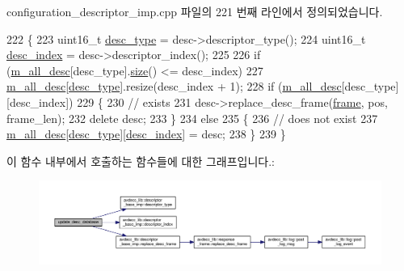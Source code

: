 configuration\+\_\+descriptor\+\_\+imp.\+cpp 파일의 221 번째 라인에서 정의되었습니다.


\begin{DoxyCode}
222 \{
223     uint16\_t \hyperlink{classavdecc__lib_1_1descriptor__base__imp_a9dada313309522d04f1e52fe887442b4}{desc\_type} = desc->descriptor\_type();
224     uint16\_t \hyperlink{classavdecc__lib_1_1descriptor__base__imp_a2bbd0d8f32f687ca36aaa543c06f764c}{desc\_index} = desc->descriptor\_index();
225 
226     \textcolor{keywordflow}{if} (\hyperlink{classavdecc__lib_1_1configuration__descriptor__imp_a5f5e2579d9278982e182299588a710ff}{m\_all\_desc}[desc\_type].\hyperlink{gst__avb__playbin_8c_a439227feff9d7f55384e8780cfc2eb82}{size}() <= desc\_index)
227         \hyperlink{classavdecc__lib_1_1configuration__descriptor__imp_a5f5e2579d9278982e182299588a710ff}{m\_all\_desc}[\hyperlink{classavdecc__lib_1_1descriptor__base__imp_a9dada313309522d04f1e52fe887442b4}{desc\_type}].resize(desc\_index + 1);
228     \textcolor{keywordflow}{if} (\hyperlink{classavdecc__lib_1_1configuration__descriptor__imp_a5f5e2579d9278982e182299588a710ff}{m\_all\_desc}[desc\_type][desc\_index])
229     \{
230         \textcolor{comment}{// exists}
231         desc->replace\_desc\_frame(\hyperlink{gst__avb__playbin_8c_ac8e710e0b5e994c0545d75d69868c6f0}{frame}, pos, frame\_len);
232         \textcolor{keyword}{delete} desc;
233     \}
234     \textcolor{keywordflow}{else}
235     \{
236         \textcolor{comment}{// does not exist}
237         \hyperlink{classavdecc__lib_1_1configuration__descriptor__imp_a5f5e2579d9278982e182299588a710ff}{m\_all\_desc}[\hyperlink{classavdecc__lib_1_1descriptor__base__imp_a9dada313309522d04f1e52fe887442b4}{desc\_type}][\hyperlink{classavdecc__lib_1_1descriptor__base__imp_a2bbd0d8f32f687ca36aaa543c06f764c}{desc\_index}] = desc;
238     \}
239 \}
\end{DoxyCode}


이 함수 내부에서 호출하는 함수들에 대한 그래프입니다.\+:
\nopagebreak
\begin{figure}[H]
\begin{center}
\leavevmode
\includegraphics[width=350pt]{classavdecc__lib_1_1configuration__descriptor__imp_a98445251711b644b6da09d2354003778_cgraph}
\end{center}
\end{figure}




